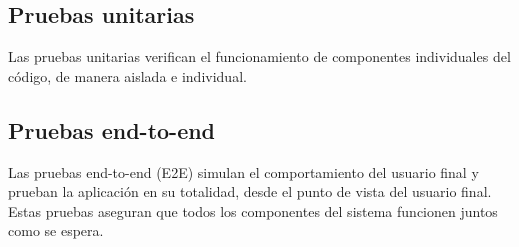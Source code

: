 \subsection{Pruebas unitarias}
Las pruebas unitarias \cite{unit-test} verifican el funcionamiento de componentes individuales del código, de manera aislada e individual.

\subsection{Pruebas end-to-end}
Las pruebas end-to-end (E2E) \cite{e2e-test} simulan el comportamiento del usuario final y prueban la aplicación en su totalidad, desde el punto de vista del usuario final. Estas pruebas aseguran que todos los componentes del sistema funcionen juntos como se espera.